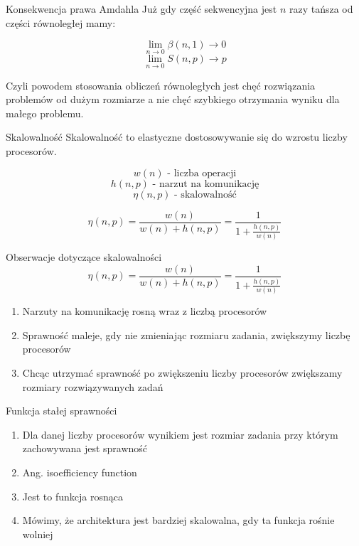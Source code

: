 \documentclass{beamer}
\begin{document}
\begin{frame}{Konsekwencja prawa Amdahla}
  Już gdy część sekwencyjna jest $n$ razy tańsza od części równoległej mamy:

  $$ \lim_{n \rightarrow 0} \beta(n,1) \rightarrow 0 $$
  $$ \lim_{n \rightarrow 0} S(n,p) \rightarrow p $$

  Czyli powodem stosowania obliczeń równoległych jest chęć rozwiązania problemów od dużym rozmiarze a nie chęć szybkiego otrzymania wyniku dla małego problemu.
\end{frame}

\begin{frame}{Skalowalność}
  Skalowalność to elastyczne dostosowywanie się do wzrostu liczby procesorów.

  $$ w(n) \mbox{ - liczba operacji}$$
  $$ h(n, p) \mbox{ - narzut na komunikację}$$
  $$ \eta(n,p) \mbox{ - skalowalność} $$


  $$ \eta(n,p) = \frac{w(n)}{w(n) + h(n,p)} = \frac{1}{1 + \frac{h(n,p)}{w(n)}} $$
\end{frame}

\begin{frame}{Obserwacje dotyczące skalowalności}
  $$ \eta(n,p) = \frac{w(n)}{w(n) + h(n,p)} = \frac{1}{1 + \frac{h(n,p)}{w(n)}} $$

  \begin{enumerate}
  \item Narzuty na komunikację rosną wraz z liczbą procesorów
  \item Sprawność maleje, gdy nie zmieniając rozmiaru zadania, zwiększymy liczbę procesorów
  \item Chcąc utrzymać sprawność po zwiększeniu liczby procesorów zwiększamy rozmiary rozwiązywanych zadań
  \end{enumerate}
\end{frame}

\begin{frame}{Funkcja stałej sprawności}
  \begin{enumerate}
  \item Dla danej liczby procesorów wynikiem jest rozmiar zadania przy którym zachowywana jest sprawność
  \item Ang. isoefficiency function
  \item Jest to funkcja rosnąca
  \item Mówimy, że architektura jest bardziej skalowalna, gdy ta funkcja rośnie wolniej
  \end{enumerate}
\end{frame}
\end{document}
